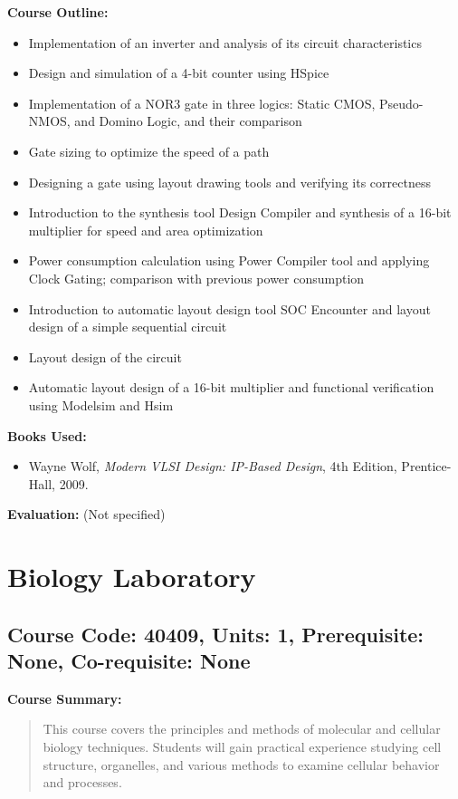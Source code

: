 \documentclass[12pt]{article}
\begin{document}
\textbf{Course Outline:}
\begin{itemize}
    \item Implementation of an inverter and analysis of its circuit characteristics
    \item Design and simulation of a 4-bit counter using HSpice
    \item Implementation of a NOR3 gate in three logics: Static CMOS, Pseudo-NMOS, and Domino Logic, and their comparison
    \item Gate sizing to optimize the speed of a path
    \item Designing a gate using layout drawing tools and verifying its correctness
    \item Introduction to the synthesis tool Design Compiler and synthesis of a 16-bit multiplier for speed and area optimization
    \item Power consumption calculation using Power Compiler tool and applying Clock Gating; comparison with previous power consumption
    \item Introduction to automatic layout design tool SOC Encounter and layout design of a simple sequential circuit
    \item Layout design of the circuit
    \item Automatic layout design of a 16-bit multiplier and functional verification using Modelsim and Hsim
\end{itemize}

\textbf{Books Used:}
\begin{itemize}
    \item Wayne Wolf, \textit{Modern VLSI Design: IP-Based Design}, 4th Edition, Prentice-Hall, 2009.
\end{itemize}

\textbf{Evaluation:}
(Not specified)

\newpage

\section{Biology Laboratory}
\subsection*{Course Code: 40409, Units: 1, Prerequisite: None, Co-requisite: None}

\textbf{Course Summary:} 
\begin{quote}
   This course covers the principles and methods of molecular and cellular biology techniques. Students will gain practical experience studying cell structure, organelles, and various methods to examine cellular behavior and processes.
\end{quote}
\end{document}
